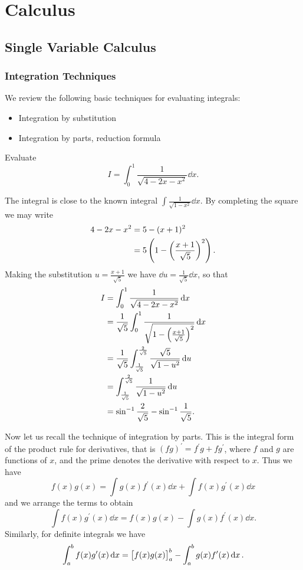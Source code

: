 \chapter{Calculus}
\section{Single Variable Calculus}
\subsection{Integration Techniques}
We review the following basic techniques for evaluating integrals:
\begin{itemize}
\item Integration by substitution
\item Integration by parts, reduction formula
\end{itemize}

\begin{exercise}
Evaluate
\[I=\int_{0}^{1}\frac{1}{\sqrt{4-2x-x^2}}\dd{x}.\]
\end{exercise}

\begin{solution}
The integral is close to the known integral $\int\frac{1}{\sqrt{1-x^2}}\dd{x}$. By completing the square we may write
\begin{align*}
4-2x-x^2&=5-(x+1)^2\\
&=5\left(1-\left(\frac{x+1}{\sqrt{5}}\right)^2\right).
\end{align*}
Making the substitution $u=\frac{x+1}{\sqrt{5}}$ we have $\dd{u}=\frac{1}{\sqrt{5}}\dd{x}$, so that
\begin{align*}
I&=\int_{0}^{1}\frac{1}{\sqrt{4-2x-x^2}}\dd{x}\\
&=\frac{1}{\sqrt{5}}\int_{0}^{1}\frac{1}{\sqrt{1-\left(\frac{x+1}{\sqrt{5}}\right)^2}}\dd{x}\\
&=\frac{1}{\sqrt{5}}\int_{\frac{1}{\sqrt{5}}}^{\frac{2}{\sqrt{5}}}\frac{\sqrt{5}}{\sqrt{1-u^2}}\dd{u}\\
&=\int_{\frac{1}{\sqrt{5}}}^{\frac{2}{\sqrt{5}}}\frac{1}{\sqrt{1-u^2}}\dd{u}\\
&=\sin^{-1}\frac{2}{\sqrt{5}}-\sin^{-1}\frac{1}{\sqrt{5}}.
\end{align*}
\end{solution}

Now let us recall the technique of integration by parts. This is the integral form of the product rule for derivatives, that is $(fg)^\prime=f^\prime g+fg^\prime$, where $f$ and $g$ are functions of $x$, and the prime denotes the derivative with respect to $x$. Thus we have
\[f(x)g(x)=\int g(x)f^\prime(x)\dd{x}+\int f(x)g^\prime(x)\dd{x}\]
and we arrange the terms to obtain
\[\int f(x)g^\prime(x)\dd{x}=f(x)g(x)-\int g(x)f^\prime(x)\dd{x}.\]
Similarly, for definite integrals we have
\[\int_{a}^{b}f(x)g^\prime(x)\dd{x}=\left[f(x)g(x)\right]_a^b-\int_{a}^{b}g(x)f^\prime(x)\dd{x}.\]

